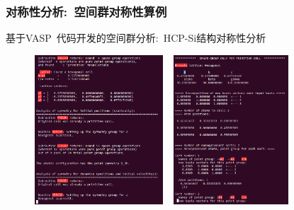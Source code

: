 \documentclass[cjk,slidestop,handout,compress,mathserif,blue]{beamer}	%
\begin{document}
\frame
{
	\frametitle{对称性分析:~空间群对称性算例}
	基于\textrm{VASP~}代码开发的空间群分析:~\textrm{HCP-Si}结构对称性分析
\begin{figure}[h!]
\centering
\includegraphics[height=2.2in,width=1.9in,viewport=0 0 520 570,clip]{Figures/HCP_Si_Symm-1.png}
\hspace*{0.01in}
\includegraphics[height=2.2in,width=1.9in,viewport=0 0 520 580,clip]{Figures/HCP_Si_Symm-2.png}
\caption{\fontsize{7.2pt}{4.2pt}}
\label{Symmetry_Analysis}
\end{figure} 
}
\end{document}
